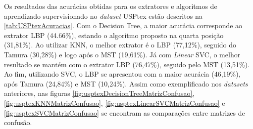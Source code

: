 \par Os resultados das acurácias obtidas para os extratores e algoritmos de aprendizado supervisionado no \textit{dataset} USPtex estão descritos na \autoref{tab:USPtexAcuracias}. Com o Decision Tree, a maior acurácia corresponde ao extrator LBP (44.66\%), estando o algoritmo proposto na quarta posição (31,81\%). Ao utilizar KNN, o melhor extrator é o LBP (77,12\%), seguido do Tamura (30,28\%) e logo após o MST (19,61\%). Já com \textit{Linear} SVC, o melhor resultado se mantém com o extrator LBP (76,47\%), seguido pelo MST (13,51\%). Ao fim, utilizando SVC, o LBP se apresentou com a maior acurácia (46,19\%), após Tamura (24,84\%) e MST (10,24\%). Assim como exemplificado nos \textit{datasets} anteriores, nas figuras \ref{fig:usptexDecisionTreeMatrizConfusao}, \ref{fig:usptexKNNMatrizConfusao}, \ref{fig:usptexLinearSVCMatrizConfusao} e \ref{fig:usptexSVCMatrizConfusao} se encontram as comparações entre matrizes de confusão.




